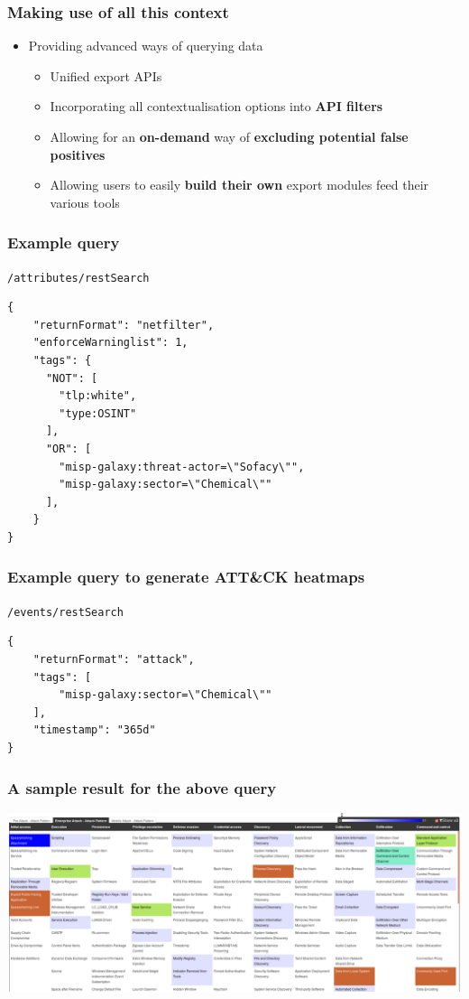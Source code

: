 \begin{frame}
  \frametitle{Making use of all this context}
  \begin{itemize}
    \item Providing advanced ways of querying data
    \begin{itemize}
      \item Unified export APIs
      \item Incorporating all contextualisation options into {\bf API filters}
      \item Allowing for an {\bf on-demand} way of {\bf excluding potential false positives}
      \item Allowing users to easily {\bf build their own} export modules feed their various tools
    \end{itemize}
  \end{itemize}
\end{frame}

\begin{frame}[fragile]
    \frametitle{Example query}
    \texttt{/attributes/restSearch}
    \begin{lstlisting}
{
    "returnFormat": "netfilter",
    "enforceWarninglist": 1,
    "tags": {
      "NOT": [
        "tlp:white",
        "type:OSINT"
      ],
      "OR": [
        "misp-galaxy:threat-actor=\"Sofacy\"",
        "misp-galaxy:sector=\"Chemical\""
      ],
    }
}
    \end{lstlisting}
\end{frame}

\begin{frame}[fragile]
    \frametitle{Example query to generate ATT\&CK heatmaps}
    \texttt{/events/restSearch}
    \begin{lstlisting}
{
    "returnFormat": "attack",
    "tags": [
        "misp-galaxy:sector=\"Chemical\""
    ],
    "timestamp": "365d"
}
    \end{lstlisting}
\end{frame}

\begin{frame}
  \frametitle{A sample result for the above query}
  \begin{center}
    \includegraphics[scale=0.2]{attack-screenshot.png}
  \end{center}
\end{frame}

